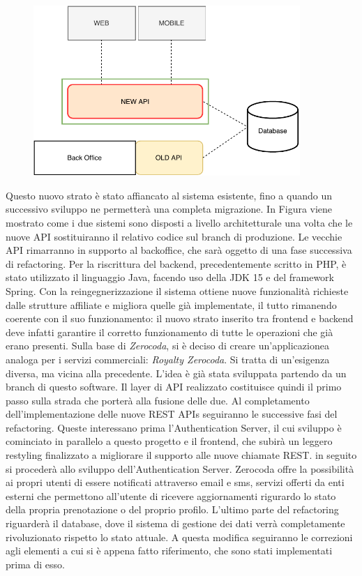 \documentclass[a4paper,11pt]{article}
\begin{document}
	\begin{figure}
		\centering
		\includegraphics[width=0.90\textwidth]{images/01_nuove_api.pdf}
	\end{figure}
	Questo nuovo strato è stato affiancato al sistema esistente, fino a quando un successivo sviluppo ne permetterà una completa migrazione. In Figura viene mostrato come i due sistemi sono disposti a livello architetturale una volta che le nuove API sostituiranno il relativo codice sul branch di produzione. Le vecchie API rimarranno in supporto al backoffice, che sarà oggetto di una fase successiva di refactoring. Per la riscrittura del backend, precedentemente scritto in PHP, è stato utilizzato il linguaggio Java, facendo uso della JDK 15 e del framework Spring. Con la reingegnerizzazione il sistema ottiene nuove funzionalità richieste dalle strutture affiliate e migliora quelle già implementate, il tutto rimanendo coerente con il suo funzionamento: il nuovo strato inserito tra frontend e backend deve infatti garantire il corretto funzionamento di tutte le operazioni che già erano presenti. Sulla base di \emph{Zerocoda}, si è deciso di creare un’applicazionea analoga per i servizi commerciali: \emph{Royalty Zerocoda}. Si tratta di un’esigenza diversa, ma vicina alla precedente. L’idea è già stata sviluppata partendo da un branch di questo software. Il layer di API realizzato costituisce quindi il primo passo sulla strada che porterà alla fusione delle due.
	Al completamento dell'implementazione delle nuove REST APIs seguiranno le successive fasi del refactoring. Queste interessano prima l'Authentication Server, il cui sviluppo è cominciato in parallelo a questo progetto e il frontend, che subirà un leggero restyling finalizzato a migliorare il supporto alle nuove chiamate REST. in seguito si procederà allo sviluppo dell'Authentication Server. Zerocoda offre la possibilità ai propri utenti di essere notificati attraverso email e sms, servizi offerti da enti esterni che permettono all'utente di ricevere aggiornamenti rigurardo lo stato della propria prenotazione o del proprio profilo. L'ultimo parte del refactoring riguarderà il database, dove il sistema di gestione dei dati verrà completamente rivoluzionato rispetto lo stato attuale. A questa modifica seguiranno le correzioni agli elementi a cui si è appena fatto riferimento, che sono stati implementati prima di esso. 

   	
\end{document}
